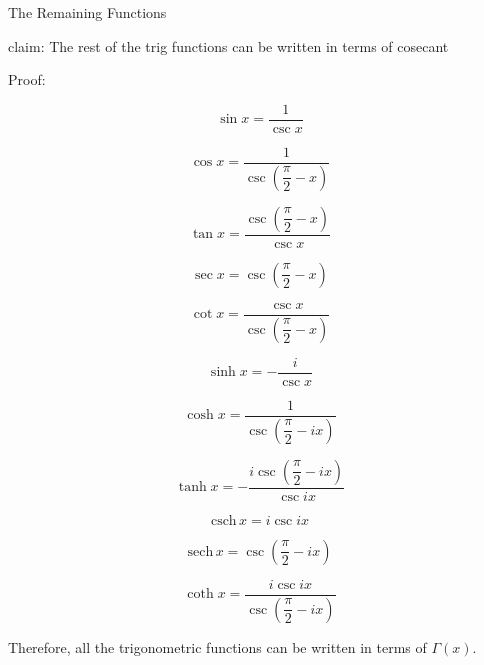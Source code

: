 \documentclass[12pt]{article}
\begin{document}
\pagebreak
\begin{section}{The Remaining Functions}
	
	\noindent claim: The rest of the trig functions can be written in terms of cosecant

	\noindent Proof:

	\begin{equation}\sin x=\dfrac1{\csc x}\end{equation}

	\begin{equation}\cos x=\dfrac1{\csc\left(\dfrac\pi2-x\right)}\end{equation}

	\begin{equation}\tan x=\dfrac{\csc\left(\dfrac\pi2-x\right)}{\csc x}\end{equation}

	
	\begin{equation}\sec x=\csc\left(\dfrac\pi2-x\right)\end{equation}

	\begin{equation}\cot x=\dfrac{\csc x}{\csc\left(\dfrac\pi2-x\right)}\end{equation}


	\begin{equation}\sinh x=-\dfrac i{\csc x}\end{equation}

	\begin{equation}\cosh x=\dfrac1{\csc\left(\dfrac\pi2-ix\right)}\end{equation}

	\begin{equation}\tanh x=-\dfrac{i\csc\left(\dfrac\pi2-ix\right)}{\csc ix}\end{equation}

	\begin{equation}\text{csch}\,x=i\csc ix\end{equation}

	\begin{equation}\text{sech}\,x=\csc\left(\dfrac\pi2-ix\right)\end{equation}

	\begin{equation}\coth x=\dfrac{i\csc ix}{\csc\left(\dfrac\pi2-ix\right)}\end{equation}

	Therefore, all the trigonometric functions can be written in terms of $\Gamma(x)$.

	\noindent\blacksquare
\end{section}
\end{document}
